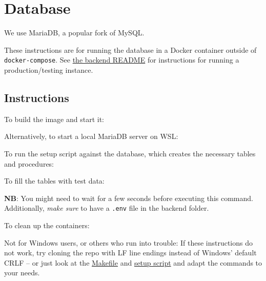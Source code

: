 \hypertarget{database}{%
\section{Database}\label{database}}

We use MariaDB, a popular fork of MySQL.

These instructions are for running the database in a Docker container
outside of \texttt{docker-compose}. See \href{../README.md}{the backend
README} for instructions for running a production/testing instance.

\hypertarget{instructions}{%
\subsection{Instructions}\label{instructions}}

To build the image and start it:

\begin{Shaded}
\begin{Highlighting}[]
\end{Highlighting}
\end{Shaded}

Alternatively, to start a local MariaDB server on WSL:

\begin{Shaded}
\begin{Highlighting}[]
\end{Highlighting}
\end{Shaded}

To run the setup script against the database, which creates the
necessary tables and procedures:

\begin{Shaded}
\begin{Highlighting}[]
\end{Highlighting}
\end{Shaded}

To fill the tables with test data:

\begin{Shaded}
\begin{Highlighting}[]
\end{Highlighting}
\end{Shaded}

\textbf{NB}: You might need to wait for a few seconds before executing
this command. Additionally, \emph{make sure} to have a \texttt{.env}
file in the backend folder.

To clean up the containers:

\begin{Shaded}
\begin{Highlighting}[]
\end{Highlighting}
\end{Shaded}

Not for Windows users, or others who run into trouble: If these
instructions do not work, try cloning the repo with LF line endings
instead of Windows' default CRLF -- or just look at the \url{Makefile}
and \href{setup.sh}{setup script} and adapt the commands to your needs.
